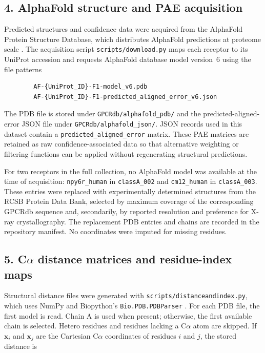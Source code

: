 \documentclass[a4paper,12pt]{article}
\begin{document}
	\subsection*{4. AlphaFold structure and PAE acquisition}
	Predicted structures and confidence data were acquired from the AlphaFold Protein Structure Database, which distributes AlphaFold predictions at proteome scale \cite{jumper2021alphafold,varadi2024afdb}. The acquisition script \texttt{scripts/download.py} maps each receptor to its UniProt accession and requests AlphaFold database model version~6 using the file patterns
	
	\begin{verbatim}
		AF-{UniProt_ID}-F1-model_v6.pdb
		AF-{UniProt_ID}-F1-predicted_aligned_error_v6.json
	\end{verbatim}
	
	The PDB file is stored under \texttt{GPCRdb/alphafold\_pdb/} and the predicted-aligned-error JSON file under \texttt{GPCRdb/alphafold\_json/}. JSON records used in this dataset contain a \texttt{predicted\_aligned\_error} matrix. These PAE matrices are retained as raw confidence-associated data so that alternative weighting or filtering functions can be applied without regenerating structural predictions.
	
	For two receptors in the full collection, no AlphaFold model was available at the time of acquisition: \texttt{npy6r\_human} in \texttt{classA\_002} and \texttt{cm12\_human} in \texttt{classA\_003}. These entries were replaced with experimentally determined structures from the RCSB Protein Data Bank, selected by maximum coverage of the corresponding GPCRdb sequence and, secondarily, by reported resolution and preference for X-ray crystallography. The replacement PDB entries and chains are recorded in the repository manifest. No coordinates were imputed for missing residues.
	
	\subsection*{5. C$\alpha$ distance matrices and residue-index maps}
	Structural distance files were generated with \texttt{scripts/distanceandindex.py}, which uses NumPy and Biopython's \texttt{Bio.PDB.PDBParser} \cite{cock2009biopython}. For each PDB file, the first model is read. Chain A is used when present; otherwise, the first available chain is selected. Hetero residues and residues lacking a C$\alpha$ atom are skipped. If $\mathbf{x}_i$ and $\mathbf{x}_j$ are the Cartesian C$\alpha$ coordinates of residues $i$ and $j$, the stored distance is
	
\end{document}
